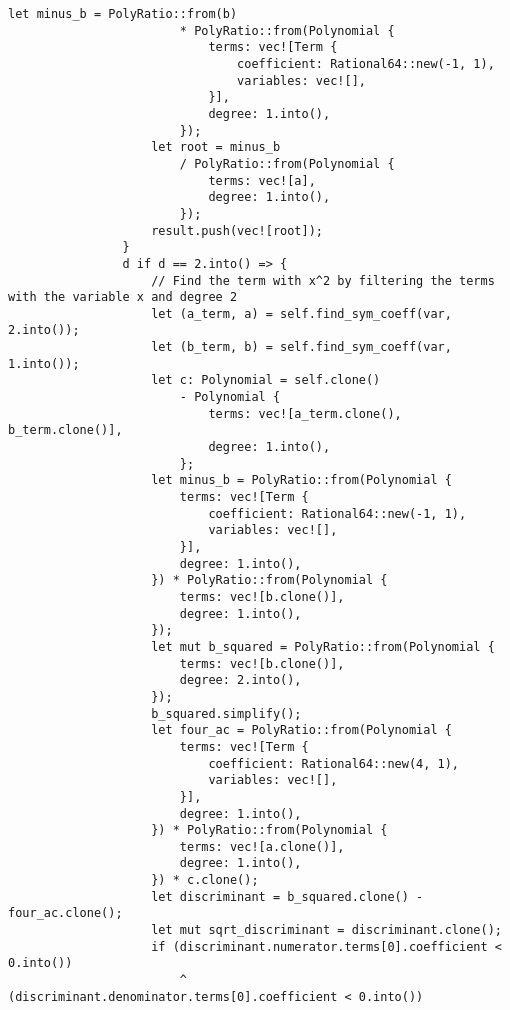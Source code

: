 {\begin{lstlisting}[caption={The implementation of the \texttt{roots()} method for the \texttt{Polynomial} struct}, label={lst:polynomial-roots}]
                    let minus_b = PolyRatio::from(b)
                        * PolyRatio::from(Polynomial {
                            terms: vec![Term {
                                coefficient: Rational64::new(-1, 1),
                                variables: vec![],
                            }],
                            degree: 1.into(),
                        });
                    let root = minus_b
                        / PolyRatio::from(Polynomial {
                            terms: vec![a],
                            degree: 1.into(),
                        });
                    result.push(vec![root]);
                }
                d if d == 2.into() => {
                    // Find the term with x^2 by filtering the terms with the variable x and degree 2
                    let (a_term, a) = self.find_sym_coeff(var, 2.into());
                    let (b_term, b) = self.find_sym_coeff(var, 1.into());
                    let c: Polynomial = self.clone()
                        - Polynomial {
                            terms: vec![a_term.clone(), b_term.clone()],
                            degree: 1.into(),
                        };
                    let minus_b = PolyRatio::from(Polynomial {
                        terms: vec![Term {
                            coefficient: Rational64::new(-1, 1),
                            variables: vec![],
                        }],
                        degree: 1.into(),
                    }) * PolyRatio::from(Polynomial {
                        terms: vec![b.clone()],
                        degree: 1.into(),
                    });
                    let mut b_squared = PolyRatio::from(Polynomial {
                        terms: vec![b.clone()],
                        degree: 2.into(),
                    });
                    b_squared.simplify();
                    let four_ac = PolyRatio::from(Polynomial {
                        terms: vec![Term {
                            coefficient: Rational64::new(4, 1),
                            variables: vec![],
                        }],
                        degree: 1.into(),
                    }) * PolyRatio::from(Polynomial {
                        terms: vec![a.clone()],
                        degree: 1.into(),
                    }) * c.clone();
                    let discriminant = b_squared.clone() - four_ac.clone();
                    let mut sqrt_discriminant = discriminant.clone();
                    if (discriminant.numerator.terms[0].coefficient < 0.into())
                        ^ (discriminant.denominator.terms[0].coefficient < 0.into())

\end{lstlisting}}

